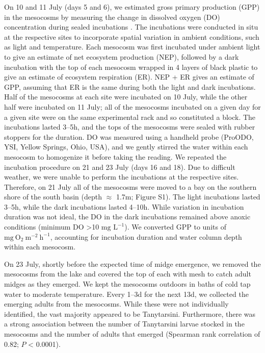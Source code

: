 \documentclass[12pt]{article}
\begin{document}
On 10 and 11 July (days 5 and 6), 
we estimated gross primary production (GPP) in the mesocosms by measuring the change in
dissolved oxygen (DO) concentration during sealed incubations 
\citep[similar to][]{phillips2019}.
The incubations were conducted in situ at the respective sites to incorporate
spatial variation in ambient conditions, such as light and temperature.
Each mesocosm was first incubated under ambient light to give an
estimate of net ecosystem production (NEP),
followed by a dark incubation with the top of each mesocosm wrapped
in 4 layers of black plastic to give an estimate of ecosystem respiration (ER).
NEP + ER gives an estimate of GPP, assuming that ER is the same during both the light
and dark incubations. Half of the mesocosms at each site were incubated on 10 July,
while the other half were incubated on 11 July;
all of the mesocosms incubated on a given day for a given site were on the same 
experimental rack and so constituted a block.
The incubations lasted 3--5h, 
and the tops of the mesocosms were sealed with rubber stoppers for the duration.
DO was measured using a handheld probe (ProODO, YSI, Yellow Springs, Ohio, USA),
and we gently stirred the water within each mesocosm to homogenize it 
before taking the reading. 
We repeated the incubation procedure on 21 and 23 July (days 16 and 18).
Due to difficult weather, 
we were unable to perform the incubations at the respective sites.
Therefore, on 21 July all of the mesocosms were moved to a bay on the
southern shore of the south basin (depth $\approx$ 1.7m; Figure S1).
The light incubations lasted 3--5h,
while the dark incubations lasted 4--10h.
While variation in incubation duration was not ideal,
the DO in the dark incubations remained above anoxic conditions 
(minimum DO >10 $\text{mg L}^{-1}$). 
We converted GPP to units of $\text{mg}~\text{O}_2~\text{m}^{-2}~\text{h}^{-1}$,
accounting for incubation duration and water column depth within each mesocosm.

On 23 July, shortly before the expected time of midge emergence,
we removed the mesocosms from the lake and covered the top of each with mesh
to catch adult midges as they emerged. 
We kept the mesocosms outdoors in baths of cold tap water 
to moderate temperature.
Every 1--3d for the next 13d, we collected the emerging adults from the mesocosms.
While these were not individually identified, the vast majority appeared to be Tanytarsini.
Furthermore, there was a strong association between the number of Tanytarsini larvae 
stocked in the mesocosms and the number of adults that emerged 
(Spearman rank correlation of 0.82; $\textit{P}$ < 0.0001).
\end{document}
